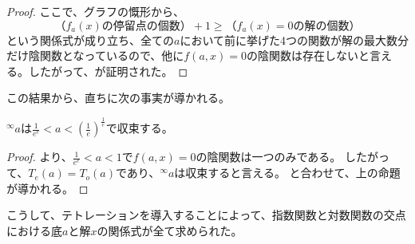 \begin{proof}
		ここで、グラフの慨形から、
		\[
			\text{（$f_a(x)$の停留点の個数）} + 1 \geq \text{（$f_a(x)=0$の解の個数）}
		\]
		という関係式が成り立ち、全ての$a$において前に挙げた4つの関数が解の最大数分だけ陰関数となっているので、他に$f(a,x)=0$の陰関数は存在しないと言える。したがって、が証明された。
	\end{proof}
	
	この結果から、直ちに次の事実が導かれる。
	\begin{theorem}
	\label{th:tetration_convergence}
		${^\infty a}$は$\frac{1}{e^e} < a < \left ( \frac{1}{e} \right )^{\frac{1}{e}}$で収束する。
	\end{theorem}
	\begin{proof}
		より、$\frac{1}{e^e} < a < 1$で$f(a,x)=0$の陰関数は一つのみである。
		したがって、$T_e(a) = T_o(a)$であり、${^\infty a}$は収束すると言える。
		と合わせて、上の命題が導かれる。
	\end{proof}
	
	こうして、テトレーションを導入することによって、指数関数と対数関数の交点における底$a$と解$x$の関係式が全て求められた。
	